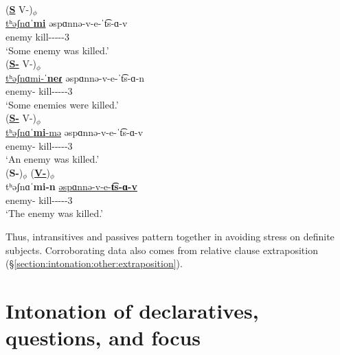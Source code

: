 \begin{exe}
	\ex \label{example:inton:broad:intrans:pass:kill} \begin{xlist}
		\ex \glll  (\textbf{\underline{S}} V-{\pass})$_\phi$ \\
		\underline{tʰəʃnɑˈ\textbf{mi}} əspɑnnə-v-e-ˈ{t͡s-ɑ-v} \\
		enemy kill-{\pass}-{\thgloss}-{\aorperf}-{\pst}-3{\sg} \\
		\trans `Some enemy was killed.'
		\\ 
		\ex \glll  (\textbf{\underline{S-{\pl}}} V-{\pass})$_\phi$ \\
		\underline{tʰəʃnɑmi-ˈ\textbf{neɾ}} əspɑnnə-v-e-ˈ{t͡s-ɑ-n} \\
		enemy-{\pl} kill-{\pass}-{\thgloss}-{\aorperf}-{\pst}-3{\pl} \\
		\trans `Some enemies were killed.'
		\\ 
		\ex \glll  (\textbf{\underline{S-{\indf}}} V-{\pass})$_\phi$ \\
		\underline{tʰəʃnɑˈ\textbf{mi}-mə} əspɑnnə-v-e-ˈ{t͡s-ɑ-v} \\
		enemy-{\indf} kill-{\pass}-{\thgloss}-{\aorperf}-{\pst}-3{\sg} \\
		\trans `An enemy was  killed.'
		\\ 
		\ex \glll (\textbf{{S-{}}})$_\phi$ (\textbf{\underline{V-{\pass}}})$_\phi$ \\
		{{tʰəʃnɑˈ\textbf{mi-n}}} \underline{əspɑnnə-v-e-\textbf{t͡s-ɑ-v}} \\ 
		enemy-{} kill-{\pass}-{\thgloss}-{\aorperf}-{\pst}-3{\sg} \\
		\trans `The enemy was killed.'
		\\  
		
	\end{xlist}
\end{exe}

Thus, intransitives and passives pattern together in avoiding stress on definite subjects. Corroborating data also comes from relative clause extraposition (\S\ref{section:intonation:other:extraposition}). 

\section{Intonation of declaratives, questions, and focus}\label{section:intonation:focus}

